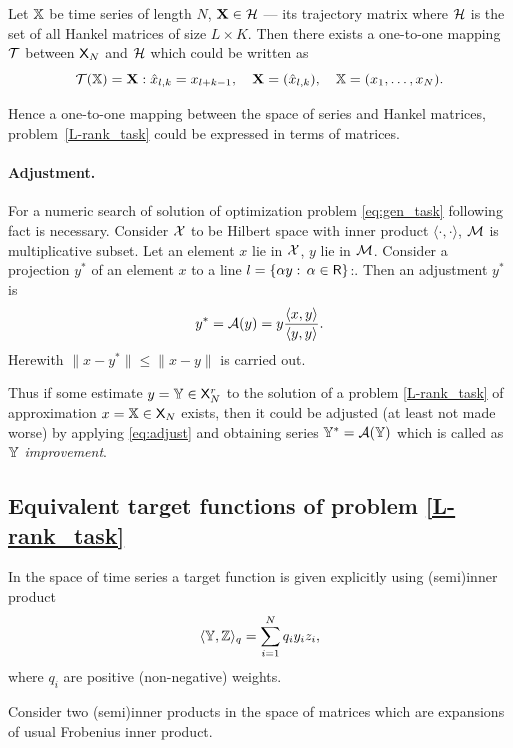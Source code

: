 \documentclass[12pt,a4paper,fleqn,leqno]{article}
\begin{document}
Let $\mathbb{X}$ be time series of length $N$, $\mathbf{X} \in \mathcal{H}$ --- its trajectory matrix where $\mathcal{H}$ is the set of all Hankel matrices of size $L \times K$. Then there exists a one-to-one mapping $\mathcal{T}$ between $\mathsf{X}_N$ and $\mathcal{H}$ which could be written as
\begin{equation*}
\mathcal{T}(\mathbb{X}) = \mathbf{X}: \hat x_{l, k} = x_{l + k - 1}, \quad \mathbf{X} = (\hat x_{l,k}), \quad \mathbb{X} = (x_1, \ldots, x_N).
\end{equation*}

Hence a one-to-one mapping between the space of series and Hankel matrices,
problem~\eqref{L-rank_task} could be expressed in terms of matrices.

\paragraph{Adjustment.} For a numeric search of solution of optimization problem \eqref{eq:gen_task} following fact is necessary.
Consider $\mathcal{X}$ to be Hilbert space with inner product $\langle\cdot, \cdot\rangle$, $\mathcal{M}$ is multiplicative subset. Let an element $x$ lie in $\mathcal{X}$, $y$ lie in $\mathcal{M}$. Consider a projection $y^*$ of an element $x$ to a line $l = \{\alpha y:\, \alpha \in \mathsf{R}\}$:. Then an adjustment $y^*$ is
\begin{equation}
\label{eq:adjust}
y^* = \mathcal{A}(y)= y \frac{\langle x, y\rangle}{\langle y, y\rangle}.
\end{equation}
Herewith $\|x - y^*\| \le \|x - y\|$ is carried out.

Thus if some estimate $y=\mathbb{Y} \in \mathsf{X}_N^r$ to the solution of a problem \eqref{L-rank_task} of approximation $x=\mathbb{X} \in \mathsf{X}_N$ exists, then it could be adjusted (at least not made worse) by applying \eqref{eq:adjust} and obtaining series $\mathbb{Y}^*=\mathcal{A}(\mathbb{Y})$ which is called as \emph{$\mathbb{Y}$ improvement}.

\subsection{Equivalent target functions of problem \eqref{L-rank_task}}
In the space of time series a target function is given explicitly using (semi)inner product
\begin{equation}
\label{eq:norm_ser}
    \langle\mathbb{Y},\mathbb{Z}\rangle_q = \sum_{i = 1}^N q_i y_i z_i,
\end{equation}
where $q_i$ are positive (non-negative) weights.

Consider two (semi)inner products in the space of matrices which are expansions of usual Frobenius inner product.
\end{document}
